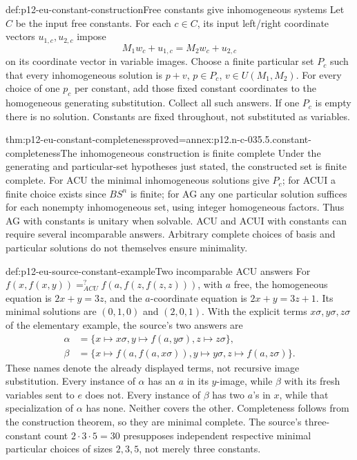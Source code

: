 \begin{hbmethod}{def:p12-eu-constant-construction}{Free constants give inhomogeneous systems}
Let \(C\) be the input free constants. For each \(c\in C\),
its input left/right coordinate vectors \(u_{1,c},u_{2,c}\) impose
\[
                    M_1w_c+u_{1,c}=M_2w_c+u_{2,c}
\]
on its coordinate vector in variable images. Choose a finite particular
set \(P_c\) such that every inhomogeneous solution is \(p+v\),
\(p\in P_c\), \(v\in U(M_1,M_2)\). For every choice of one
\(p_c\) per constant, add those fixed constant coordinates to the
homogeneous generating substitution. Collect all such answers. If
one \(P_c\) is empty there is no solution. Constants are fixed
throughout, not substituted as variables.
\cite[\S5.1, pp.~507--508]{BaaderSnyder2001}
\end{hbmethod}

\begin{hbtheorem}{thm:p12-eu-constant-completeness}{proved=annex:p12.n-c-035.5.constant-completeness}{The inhomogeneous construction is finite complete}
Under the generating and particular-set hypotheses just stated, the
constructed set is finite complete. For ACU the minimal inhomogeneous
solutions give \(P_c\); for ACUI a finite choice exists since
\(BS^n\) is finite; for AG any one particular solution suffices
for each nonempty inhomogeneous set, using integer homogeneous factors.
Thus AG with constants is unitary when solvable. ACU and ACUI with
constants can require several incomparable answers. Arbitrary complete
choices of basis and particular solutions do not themselves ensure minimality.
\end{hbtheorem}

\begin{hbexample}{def:p12-eu-source-constant-example}{Two incomparable ACU answers}
For \(f(x,f(x,y))=^{?}_{ACU}f(a,f(z,f(z,z)))\), with \(a\) free,
the homogeneous equation is \(2x+y=3z\), and the \(a\)-coordinate
equation is \(2x+y=3z+1\). Its minimal solutions are \((0,1,0)\)
and \((2,0,1)\). With the explicit terms \(x\sigma,y\sigma,z\sigma\)
of the elementary example, the source's two answers are
\[
\begin{aligned}
 \alpha&=\{x\mapsto x\sigma,y\mapsto f(a,y\sigma),z\mapsto z\sigma\},\\
 \beta&=\{x\mapsto f(a,f(a,x\sigma)),y\mapsto y\sigma,
                              z\mapsto f(a,z\sigma)\}.
\end{aligned}
\]
These names denote the already displayed terms, not recursive image
substitution. Every instance of \(\alpha\) has an \(a\) in its
\(y\)-image, while \(\beta\) with its fresh variables sent to \(e\)
does not. Every instance of \(\beta\) has two \(a\)'s in \(x\),
while that specialization of \(\alpha\) has none. Neither covers the
other. Completeness follows from the construction theorem, so they
are minimal complete. The source's three-constant count \(2\cdot3\cdot5=30\)
presupposes independent respective minimal particular choices of sizes
\(2,3,5\), not merely three constants.
\cite[pp.~507--508]{BaaderSnyder2001}
\end{hbexample}

